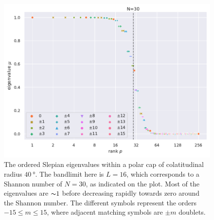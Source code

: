 \begin{figure}[htpb]
	\centering\capstart{}
	\includegraphics[width=\textwidth]{polar_cap_eigenvalues.pdf}
	\caption[
        The Slepian eigenvalues within a \(\SI{40}{\degree}\) polar cap
	]{
        The ordered Slepian eigenvalues within a polar cap of colatitudinal radius \(\SI{40}{\degree}\).
        The bandlimit here is  \(L=16\), which corresponds to a Shannon number of \(N=30\), as indicated on the plot.
        Most of the eigenvalues are \({\thicksim}1\) before decreasing rapidly towards zero around the Shannon number.
        The different symbols represent the orders \(-15 \leq m \leq 15\), where adjacent matching symbols are \(\pm m\) doublets.
	}\label{fig:chapter2_polar_cap_eigenvalues}
\end{figure}
